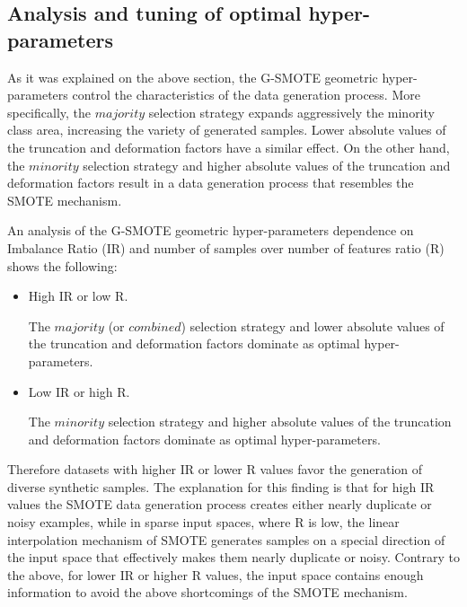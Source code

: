 \documentclass[parskip=full]{scrartcl}
\begin{document}
\subsection{Analysis and tuning of optimal hyper-parameters}

As it was explained on the above section, the G-SMOTE geometric hyper-parameters
control the characteristics of the data generation process. More specifically,
the \( majority \) selection strategy expands aggressively the minority class
area, increasing the variety of generated samples. Lower absolute values of the
truncation and deformation factors have a similar effect. On the other hand, the
\( minority \) selection strategy and higher absolute values of the truncation
and deformation factors result in a data generation process that resembles the
SMOTE mechanism. 

An analysis of the G-SMOTE geometric hyper-parameters dependence on Imbalance
Ratio (IR) and number of samples over number of features ratio (R) shows the
following: 

\begin{itemize}
	
	\renewcommand\labelitemi{--}

	\item High IR or low R.
	
	The \( majority \) (or \( combined \)) selection strategy and lower absolute
	values of the truncation and deformation factors dominate as optimal
	hyper-parameters.

	\item Low IR or high R. 
	
	The \( minority \) selection strategy and higher absolute values of the
	truncation and deformation factors dominate as optimal hyper-parameters.

\end{itemize}

Therefore datasets with higher IR or lower R values favor the generation of
diverse synthetic samples. The explanation for this finding is that for high IR
values the SMOTE data generation process creates either nearly duplicate or
noisy examples, while in sparse input spaces, where R is low, the linear
interpolation mechanism of SMOTE generates samples on a special direction of the
input space that effectively makes them nearly duplicate or noisy. Contrary to
the above, for lower IR or higher R values, the input space contains enough
information to avoid the above shortcomings of the SMOTE mechanism.
\end{document}
